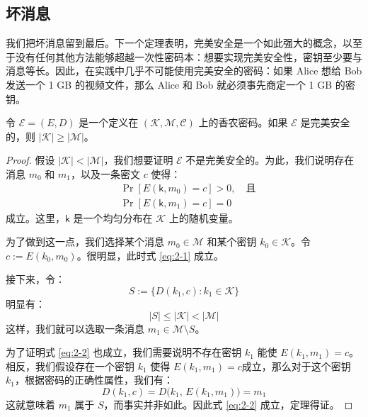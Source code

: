 \subsection{坏消息}\label{subsec:2-1-3}

我们把坏消息留到最后。下一个定理表明，完美安全是一个如此强大的概念，以至于没有任何其他方法能够超越一次性密码本：想要实现完美安全性，密钥至少要与消息等长。因此，在实践中几乎不可能使用完美安全的密码：如果 Alice 想给 Bob 发送一个 1 GB 的视频文件，那么 Alice 和 Bob 就必须事先商定一个 1 GB 的密钥。

\begin{theorem}[香农定理]\label{theo:2-5}
令 $\mathcal{E}=(E,D)$ 是一个定义在 $(\mathcal{K},\mathcal{M},\mathcal{C})$ 上的香农密码。如果 $\mathcal{E}$ 是完美安全的，则 $|\mathcal{K}|\geq|\mathcal{M}|$。
\end{theorem}

\begin{proof}
假设 $|\mathcal{K}|<|\mathcal{M}|$，我们想要证明 $\mathcal{E}$ 不是完美安全的。为此，我们说明存在消息 $m_0$ 和 $m_1$，以及一条密文 $c$ 使得：
\begin{align}
& \Pr[E(\mathsf{k},m_0)=c]>0,\quad\text{且} \label{eq:2-1}\\
& \Pr[E(\mathsf{k},m_1)=c]=0 \label{eq:2-2}
\end{align}
成立。这里，$\mathsf{k}$ 是一个均匀分布在 $\mathcal{K}$ 上的随机变量。

为了做到这一点，我们选择某个消息 $m_0\in\mathcal{M}$ 和某个密钥 $k_0\in\mathcal{K}$。令 $c:=E(k_0,m_0)$。很明显，此时式 \ref{eq:2-1} 成立。

接下来，令：
\[
S:=\{D(k_1,c):k_1\in\mathcal{K}\}
\]
明显有：
\[
|S|\leq|\mathcal{K}|<|\mathcal{M}|
\]
这样，我们就可以选取一条消息 $m_1\in \mathcal{M}\setminus S$。

为了证明式 \ref{eq:2-2} 也成立，我们需要说明不存在密钥 $k_1$ 能使 $E(k_1,m_1) = c$。相反，我们假设存在一个密钥 $k_1$ 使得 $E(k_1,m_1) = c$成立，那么对于这个密钥 $k_1$，根据密码的正确性属性，我们有：
\[
D(k_1,c)=D\big(k_1,\,E(k_1,m_1)\big)=m_1
\]
这就意味着 $m_1$ 属于 $S$，而事实并非如此。因此式 \ref{eq:2-2} 成立，定理得证。
\end{proof}